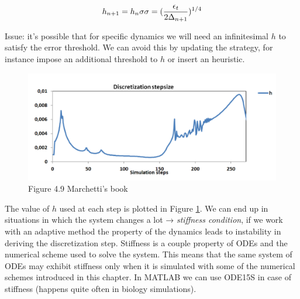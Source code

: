   $$h_{n+1}=h_n\sigma \\ \sigma =(\frac{\epsilon_t}{2\Delta_{n+1}})^{1/4}$$

\noindent
  Issue: it's possible that for specific dynamics we will need an infinitesimal $h$ to satisfy the error threshold.
  We can avoid this by updating the strategy, for instance impose an additional threshold to $h$ or insert an heuristic.


\begin{figure}
  \centering
   \includegraphics[width=\textwidth]{discretization.png}
  \caption{ Figure 4.9 Marchetti's book}
  \label{fig:discretization}
\end{figure}

  The value of $h$ used at each step is plotted in Figure \ref{fig:discretization}. We can end up in situations in which the system changes a lot → \emph{stiffness condition}, if we work with an adaptive method the property of the dynamics leads to instability in deriving the discretization step.
  Stiffness is a couple property of ODEs and the numerical scheme used to solve the system.
  This means that the same system of ODEs may exhibit stiffness only when it is simulated with some of the numerical schemes introduced in this chapter.
  In MATLAB we can use ODE15S in case of stiffness (happens quite often in biology simulations).
